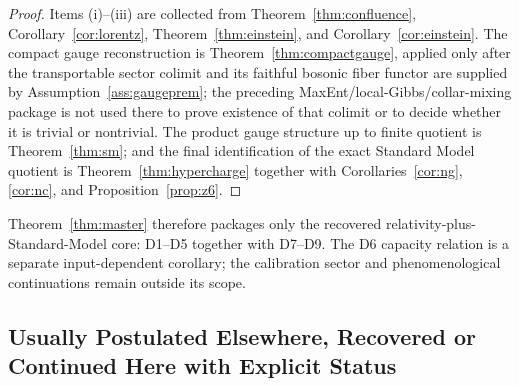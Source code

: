 \documentclass[11pt]{article}
\begin{document}
\begin{proof}
Items (i)--(iii) are collected from Theorem~\ref{thm:confluence}, Corollary~\ref{cor:lorentz}, Theorem~\ref{thm:einstein}, and Corollary~\ref{cor:einstein}. The compact gauge reconstruction is Theorem~\ref{thm:compactgauge}, applied only after the transportable sector colimit and its faithful bosonic fiber functor are supplied by Assumption~\ref{ass:gaugeprem}; the preceding MaxEnt/local-Gibbs/collar-mixing package is not used there to prove existence of that colimit or to decide whether it is trivial or nontrivial. The product gauge structure up to finite quotient is Theorem~\ref{thm:sm}; and the final identification of the exact Standard Model quotient is Theorem~\ref{thm:hypercharge} together with Corollaries~\ref{cor:ng}, \ref{cor:nc}, and Proposition~\ref{prop:z6}.
\end{proof}

Theorem~\ref{thm:master} therefore packages only the recovered relativity-plus-Standard-Model core: D1--D5 together with D7--D9. The D6 capacity relation is a separate input-dependent corollary; the calibration sector and phenomenological continuations remain outside its scope.

\subsection*{Usually Postulated Elsewhere, Recovered or Continued Here with Explicit Status}
\end{document}
